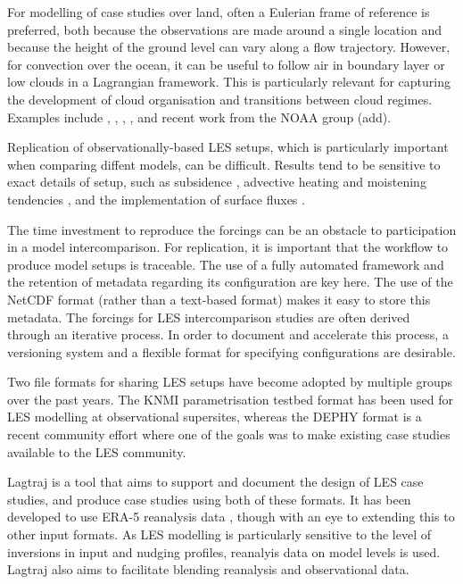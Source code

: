 \documentclass[a4paper,11pt]{article}
\begin{document}
For modelling of case studies over land, often a Eulerian frame of
reference is preferred, both because the observations are made around a
single location and because the height of the ground level can vary
along a flow trajectory. However, for convection over the ocean, it can
be useful to follow air in boundary layer or low clouds in a Lagrangian
framework. This is particularly relevant for capturing the development
of cloud organisation and transitions between cloud regimes. Examples
include \cite{bretherton1999}, \cite{roode2016}, \cite{tomassini2017},
\cite{mohrmann2019}, \cite{neggers2019} and recent work from the NOAA group
(add).

Replication of observationally-based LES setups, which is particularly
important when comparing diffent models, can be difficult. Results tend
to be sensitive to exact details of setup, such as subsidence
\citep{hohenegger2013,kurowski2020}, advective heating and moistening
tendencies \citep{smalley2019}, and the implementation of surface
fluxes \citep{stevens2001}.

The time investment to reproduce the forcings can be an obstacle to
participation in a model intercomparison. For replication, it is
important that the workflow to produce model setups is traceable. The
use of a fully automated framework and the retention of metadata
regarding its configuration are key here. The use of the NetCDF format
(rather than a text-based format) makes it easy to store this metadata.
The forcings for LES intercomparison studies are often derived through
an iterative process. In order to document and accelerate this process,
a versioning system and a flexible format for specifying configurations
are desirable.

Two file formats for sharing LES setups have become adopted by multiple
groups over the past years. The KNMI parametrisation testbed format has
been used for LES modelling at observational supersites, whereas the
DEPHY format is a recent community effort where one of the goals was to
make existing case studies available to the LES community.

Lagtraj is a tool that aims to support and document the design of LES
case studies, and produce case studies using both of these formats. It
has been developed to use ERA-5 reanalysis data \citep{hersbach2020},
though with an eye to extending this to other input formats. As LES
modelling is particularly sensitive to the level of inversions in input
and nudging profiles, reanalyis data on model levels is used. Lagtraj
also aims to facilitate blending reanalysis and observational data.
\end{document}
